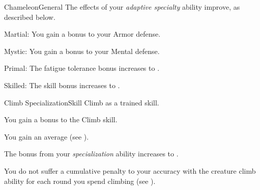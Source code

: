 \begin{feat}{Chameleon}{General}
     The effects of your \textit{adaptive specialty} ability improve, as described below.
    \begin{raggeditemize}
      \item Martial: You gain a  bonus to your Armor defense.
      \item Mystic: You gain a  bonus to your Mental defense.
      \item Primal: The fatigue tolerance bonus increases to .
      \item Skilled: The skill bonus increases to .
    \end{raggeditemize}
  \end{feat}

  \begin{feat}{Climb Specialization}{Skill}
    \featpre Climb as a trained skill.

     You gain a  bonus to the Climb skill.

     You gain an average  (see ).

     The bonus from your \textit{specialization} ability increases to .

     You do not suffer a cumulative  penalty to your accuracy with the creature climb ability for each round you spend climbing (see ).
  \end{feat}

